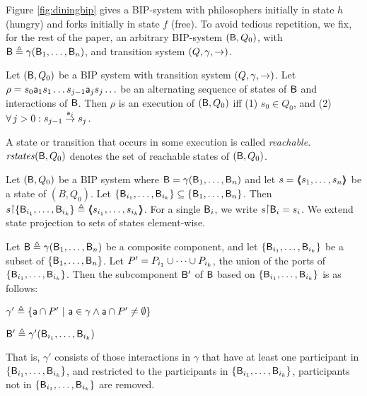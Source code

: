 \noindent
Figure \ref{fig:diningbip} gives a BIP-system with philosophers initially in state $h$ (hungry) and forks initially in
state $f$ (free).
%
To avoid tedious repetition, we fix, for the rest of the paper, an arbitrary BIP-system $(\B, Q_0)$, with
$\B \df \gamma(\B_1,\dots,\B_n)$, and transition system $(Q,\gamma, \goestog)$.

\begin{definition}[Execution]\label{def.bip.execution} Let $(\B, Q_0)$ be a BIP system
with transition system $(Q,\gamma, \goestog)$.  Let $\rho = s_0 \act_1 s_1 \ldots s_{j-1} \act_j s_j \ldots$ be an alternating sequence of
states of $\B$ and interactions of $\B$. Then $\rho$ is an execution of
$(\B, Q_0)$ iff (1) $s_0 \in Q_0$, and (2) $\fa j > 0: s_{j-1} \goesto[\act_j] s_j$. 
\end{definition}

\begin{definition}\label{def.bip.reachable}
A state or transition that occurs in some execution is called \emph{reachable}.
$\rstates{\B,Q_0}$ denotes the set of reachable states of $(\B, Q_0)$.
\end{definition}


\begin{definition}\label{def.bip.state.projection} Let $(\B, Q_0)$ be a BIP system where $\B = \gamma(\B_1,\dots,\B_n)$ and let
$s = \tpl{s_1,\dots,s_n}$ be a state of $(B, Q_0)$. Let $\set{\B_{i_1},\dots,\B_{i_k}} \sub \set{\B_1,\dots,\B_n}$. Then
$s \pj \set{\B_{i_1},\dots,\B_{i_k}} \df \tpl{s_{i_1},\dots,s_{i_k}}$. For a single $\B_i$, we write $s \pj \B_i = s_i$.
%
We extend state projection to sets of states element-wise.
\end{definition}

\begin{definition}[Subcomponent]\label{def.bip.subcomponent} Let $\B \df \gamma(\B_1,\dots,\B_n)$ be a composite component, and let $\set{\B_{i_1},\dots,\B_{i_k}}$
be a subset of $\set{\B_{1},\dots,\B_{n}}$.  Let $P' = P_{i_1} \un \cdots \un P_{i_k}$, \ie the union of the ports of $\set{\B_{i_1},\dots,\B_{i_k}}$.
Then the subcomponent $\B'$ of $\B$ based on $\set{\B_{i_1},\dots,\B_{i_k}}$ is as follows:
%
\bn
\item $\gamma' \df \set{ \act \ints P' \st \act \in \gamma \land \act \ints P' \ne \emptyset}$
\item $\B' \df \gamma'(\B_{i_1},\dots,\B_{i_k})$ 
\en
\end{definition}
%
That is, $\gamma'$ consists of those interactions in $\gamma$ that have at least one participant in 
$\set{\B_{i_1},\dots,\B_{i_k}}$, and restricted to the participants in $\set{\B_{i_1},\dots,\B_{i_k}}$,
\ie participants not in $\set{\B_{i_1},\dots,\B_{i_k}}$ are removed.

